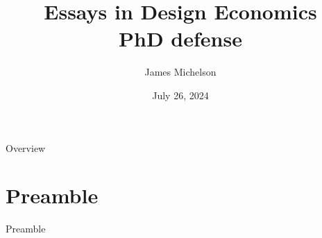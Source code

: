 \documentclass[aspectratio=169,xcolor=dvipsnames]{beamer}
\title[short title]{Essays in Design Economics \\
                    {\large PhD defense}}
\author[JM] {James Michelson}
\institute[CMU]
{
    Department of Philosophy \\
    Carnegie Mellon University 
    \vskip 3pt
}
\date{July 26, 2024}
\begin{document}
\begin{frame}
    \titlepage
\end{frame}

\begin{frame}{Overview}
    \tableofcontents
\end{frame}

\section{Preamble}


\begin{frame}

    \vspace{10mm}
    {\Large{\centerline{Preamble}}}

\end{frame}










\end{document}
